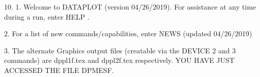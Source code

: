 10.
1. Welcome to DATAPLOT (version 04/26/2019).  For assistance at
   any time during a run, enter HELP   .

2. For a list of new commands/capabilities,
   enter NEWS  (updated 04/26/2019)

3. The alternate Graphics output files (creatable
   via the DEVICE 2 and 3 commands) are
   dppl1f.tex and dppl2f.tex respectively.
YOU HAVE JUST ACCESSED THE FILE DPMESF.

